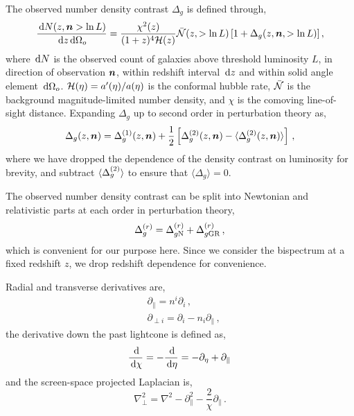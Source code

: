The observed number density contrast $\Delta_g$ is defined through, 
\begin{equation}
	\frac{\,\mathrm{d} N(z, \bm {n} > \ln L)}{\,\mathrm{d} z \,\mathrm{d} \Omega_o} = \frac{\chi^2(z)}{(1 + z)^4 \mathcal{H}(z)} \bar{\mathcal{N}}(z, > \ln L) \left[ 1 + \Delta_g(z, \bm {n}, >\ln L) \right],
\end{equation}
where $\,\mathrm{d} N$ is the observed count of galaxies above threshold luminosity $L$, in direction of observation $\bm {n}$, within redshift interval $\,\mathrm{d} z$ and within solid angle element $\,\mathrm{d} \Omega_o$. $\mathcal{H}(\eta) = a'(\eta)/a(\eta)$ is the conformal hubble rate, $\bar{\mathcal{N}}$ is the background magnitude-limited number density, and $\chi$ is the comoving line-of-sight distance. Expanding $\Delta_g$ up to second order in perturbation theory as, 
\begin{equation}
	\Delta_g(z,\bm {n}) = \Delta_g^{(1)}(z, \bm {n}) + \frac{1}{2} \left[ \Delta_g^{(2)}(z,\bm {n}) - \langle \Delta_g^{(2)}(z,\bm {n})\rangle \right]\,,
\end{equation}
where we have dropped the dependence of the density contrast on luminosity for brevity, and subtract $\langle \Delta_g^{(2)} \rangle$ to ensure that $\langle \Delta_g \rangle = 0$. 

The observed number density contrast can be split into Newtonian and relativistic parts at each order in perturbation theory,
\begin{equation}
	\Delta_g^{(r)} = \Delta_{g \mathrm{N}}^{(r)} + \Delta_{g \mathrm{GR}}^{(r)}\,,
\end{equation}
which is convenient for our purpose here. Since we consider the bispectrum at a fixed redshift $z$, we drop redshift dependence for convenience. 

Radial and transverse derivatives are, 
\begin{align}
	&\partial_{\parallel} = n^i \partial_i\,,\label{eq:partialparalleldef} \\
	&\partial_{\perp i} = \partial_i - n_i \partial_\parallel\,,\label{eq:partialperpdef}
\end{align}
the derivative down the past lightcone is defined as, 
\begin{equation}
	\frac{\,\mathrm{d}}{\,\mathrm{d} \chi} = - \frac{\,\mathrm{d}}{\,\mathrm{d} \eta} = - \partial_\eta + \partial_\parallel\,\label{eq:ddchidef}
\end{equation}
and the screen-space projected Laplacian is, 
\begin{equation}
	\nabla^2_\perp = \nabla^2 - \partial_\parallel^2 - \frac{2}{\chi} \partial_\parallel\,.
\end{equation}

